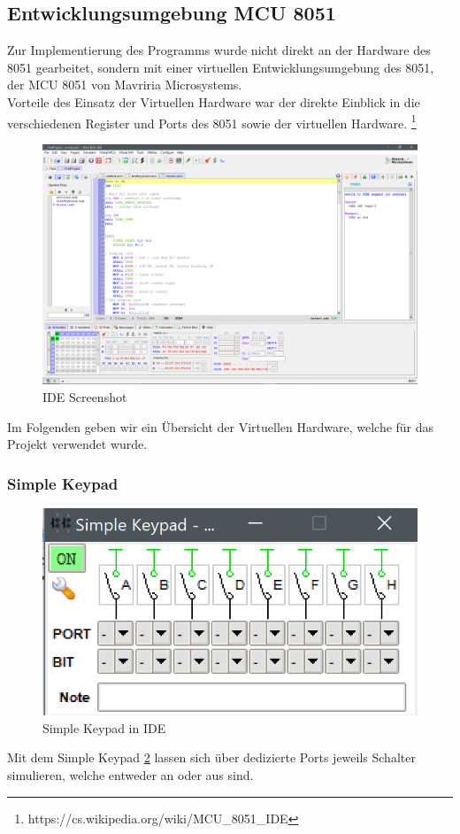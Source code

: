 \documentclass[a4paper,12pt]{article}
\begin{document}
	
	\subsection{Entwicklungsumgebung MCU 8051}
	Zur Implementierung des Programms wurde nicht direkt an der Hardware des 8051 gearbeitet, sondern mit einer virtuellen Entwicklungsumgebung des 8051, der MCU 8051 von Mavriria Microsystems.\\
	Vorteile des Einsatz der Virtuellen Hardware war der direkte Einblick in die verschiedenen Register und Ports des 8051 sowie der virtuellen Hardware. \footnote{https://cs.wikipedia.org/wiki/MCU_8051_IDE}
	\begin{figure}[bt]
		\centering
		\includegraphics[width=0.7\linewidth]{Bilder/IDE8051}
		\caption[IDE Screenshot]{IDE Screenshot}
		\label{fig:ide8051}
	\end{figure}

	Im Folgenden geben wir ein Übersicht der Virtuellen Hardware, welche für das Projekt verwendet wurde.
	\subsubsection{Simple Keypad}
	\begin{figure}[bt]
		\centering
		\includegraphics[width=0.7\linewidth]{Bilder/keypad}
		\caption[IDE Screenshot]{Simple Keypad in IDE}
		\label{fig:ide8051keybad}
	\end{figure}
	Mit dem Simple Keypad \ref{fig:ide8051keybad} lassen sich über dedizierte Ports jeweils Schalter simulieren, welche entweder an oder aus sind. 
	
\end{document}
